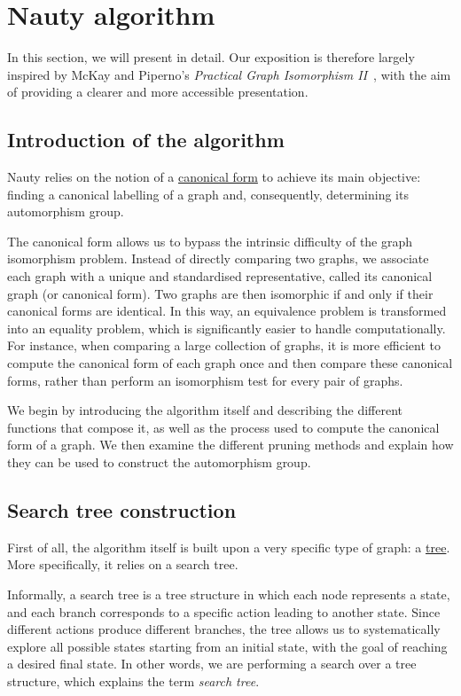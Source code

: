 \chapter{Nauty algorithm}


In this section, we will present \Naut{} in detail. Our exposition is therefore largely inspired by McKay and Piperno's \emph{Practical Graph Isomorphism II}~\cite{mckay2014practical}, with the aim of providing a clearer and more accessible presentation.


\section{Introduction of the algorithm}
Nauty relies on the notion of a \hyperref[def:canonical form]{canonical form} to achieve its main objective: finding a canonical labelling of a graph and, consequently, determining its automorphism group. 

The canonical form allows us to bypass the intrinsic difficulty of the graph isomorphism problem. Instead of directly comparing two graphs, we associate each graph with a unique and standardised representative, called its canonical graph (or canonical form). Two graphs are then isomorphic if and only if their canonical forms are identical. In this way, an equivalence problem is transformed into an equality problem, which is significantly easier to handle computationally. For instance, when comparing a large collection of graphs, it is more efficient to compute the canonical form of each graph once and then compare these canonical forms, rather than perform an isomorphism test for every pair of graphs.


We begin by introducing the algorithm itself and describing the different functions that compose it, as well as the process used to compute the canonical form of a graph. We then examine the different pruning methods and explain how they can be used to construct the automorphism group.

\section{Search tree construction}

First of all, the algorithm itself is built upon a very specific type of graph: a \hyperref[def:graph]{tree}. More specifically, it relies on a search tree.

Informally, a search tree is a tree structure in which each node represents a state, and each branch corresponds to a specific action leading to another state. Since different actions produce different branches, the tree allows us to systematically explore all possible states starting from an initial state, with the goal of reaching a desired final state. In other words, we are performing a search over a tree structure, which explains the term \textit{search tree}.


